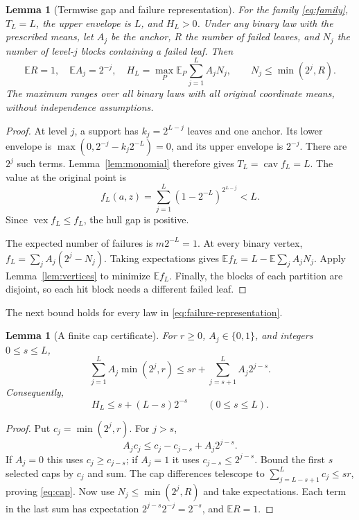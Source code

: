 \documentclass[11pt]{article}
\newtheorem{lemma}[theorem]{Lemma}
\theoremstyle{remark}
\DeclareMathOperator{\vex}{vex}
\DeclareMathOperator{\cav}{cav}
\newcommand{\E}{\mathbb E}
\begin{document}
\begin{lemma}[Termwise gap and failure representation]\label{lem:family-gap}
For the family \eqref{eq:family}, $T_L=L$, the upper envelope is $L$,
and $H_L>0$. Under any binary law with the prescribed means, let $A_j$
be the anchor, $R$ the number of failed leaves, and $N_j$ the number of
level-$j$ blocks containing a failed leaf. Then
\begin{equation}\label{eq:failure-representation}
 \E R=1,\quad \E A_j=2^{-j},\quad
 H_L=\max_P\E_P\sum_{j=1}^L A_jN_j,
 \qquad N_j\le\min(2^j,R).
\end{equation}
The maximum ranges over all binary laws with all original coordinate
means, without independence assumptions.
\end{lemma}
\begin{proof}
At level $j$, a support has $k_j=2^{L-j}$ leaves and one anchor. Its
lower envelope is $\max(0,2^{-j}-k_j2^{-L})=0$, and its upper envelope
is $2^{-j}$. There are $2^j$ such terms. Lemma~\ref{lem:monomial}
therefore gives $T_L=\cav f_L=L$. The value at the original point is
\[
 f_L(a,z)=\sum_{j=1}^L(1-2^{-L})^{2^{L-j}}<L.
\]
Since $\vex f_L\le f_L$, the hull gap is positive.

The expected number of failures is $m2^{-L}=1$. At every binary vertex,
$f_L=\sum_j A_j(2^j-N_j)$. Taking expectations gives
$\E f_L=L-\E\sum_j A_jN_j$. Apply Lemma~\ref{lem:vertices} to minimize
$\E f_L$. Finally, the blocks of each partition are disjoint, so each
hit block needs a different failed leaf.
\end{proof}

The next bound holds for every law in
\eqref{eq:failure-representation}.

\begin{lemma}[A finite cap certificate]\label{lem:cap}
For $r\ge0$, $A_j\in\{0,1\}$, and integers $0\le s\le L$,
\begin{equation}\label{eq:cap}
 \sum_{j=1}^L A_j\min(2^j,r)
 \le sr+\sum_{j=s+1}^L A_j2^{j-s}.
\end{equation}
Consequently,
\begin{equation}\label{eq:finite-hull-bound}
 H_L\le s+(L-s)2^{-s}\qquad(0\le s\le L).
\end{equation}
\end{lemma}
\begin{proof}
Put $c_j=\min(2^j,r)$. For $j>s$,
\[
 A_jc_j\le c_j-c_{j-s}+A_j2^{j-s}.
\]
If $A_j=0$ this uses $c_j\ge c_{j-s}$; if $A_j=1$ it uses
$c_{j-s}\le2^{j-s}$. Bound the first $s$ selected caps by $c_j$ and
sum. The cap differences telescope to
$\sum_{j=L-s+1}^L c_j\le sr$, proving \eqref{eq:cap}.
Now use $N_j\le\min(2^j,R)$ and take expectations. Each term in the
last sum has expectation $2^{j-s}2^{-j}=2^{-s}$, and $\E R=1$.
\end{proof}
\end{document}
